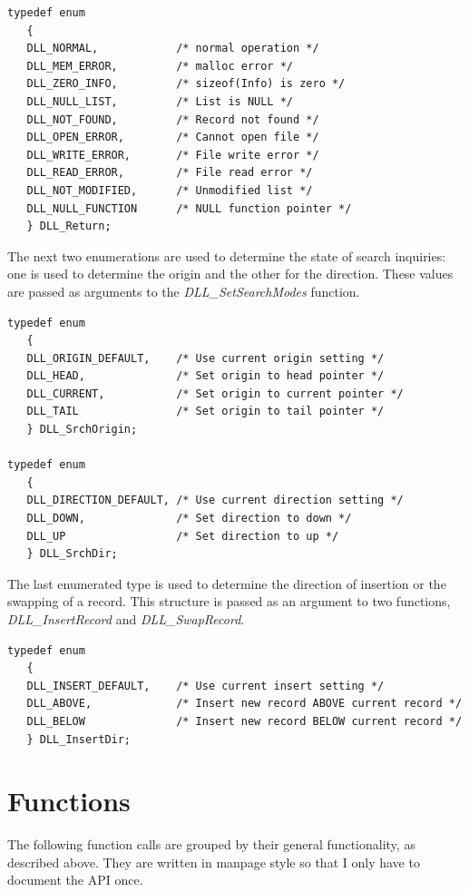 \documentclass[10pt,letterpaper,titlepage]{article}
\begin{document}
\small
\begin{verbatim}
typedef enum
   {
   DLL_NORMAL,            /* normal operation */
   DLL_MEM_ERROR,         /* malloc error */
   DLL_ZERO_INFO,         /* sizeof(Info) is zero */
   DLL_NULL_LIST,         /* List is NULL */
   DLL_NOT_FOUND,         /* Record not found */
   DLL_OPEN_ERROR,        /* Cannot open file */
   DLL_WRITE_ERROR,       /* File write error */
   DLL_READ_ERROR,        /* File read error */
   DLL_NOT_MODIFIED,      /* Unmodified list */
   DLL_NULL_FUNCTION      /* NULL function pointer */
   } DLL_Return;
\end{verbatim}
\normalsize
\vspace{8pt}

\noindent
The next two enumerations are used to determine the state of search inquiries: one is used to determine the origin and the other for the direction.  These values are passed as arguments to the \emph{DLL\_SetSearchModes} function.

\small
\begin{verbatim}
typedef enum
   {
   DLL_ORIGIN_DEFAULT,    /* Use current origin setting */
   DLL_HEAD,              /* Set origin to head pointer */
   DLL_CURRENT,           /* Set origin to current pointer */
   DLL_TAIL               /* Set origin to tail pointer */
   } DLL_SrchOrigin;

typedef enum
   {
   DLL_DIRECTION_DEFAULT, /* Use current direction setting */
   DLL_DOWN,              /* Set direction to down */
   DLL_UP                 /* Set direction to up */
   } DLL_SrchDir;
\end{verbatim}
\normalsize
\vspace{8pt}

\noindent
The last enumerated type is used to determine the direction of insertion or the swapping of a record.  This structure is passed as an argument to two functions, \emph{DLL\_InsertRecord} and \emph{DLL\_SwapRecord}.

\small
\begin{verbatim}
typedef enum
   {
   DLL_INSERT_DEFAULT,    /* Use current insert setting */
   DLL_ABOVE,             /* Insert new record ABOVE current record */
   DLL_BELOW              /* Insert new record BELOW current record */
   } DLL_InsertDir;
\end{verbatim}
\normalsize
\newpage

\section{Functions}
The following function calls are grouped by their general functionality, as described above.  They are written in manpage style so that I only have to document the API once.
\end{document}
